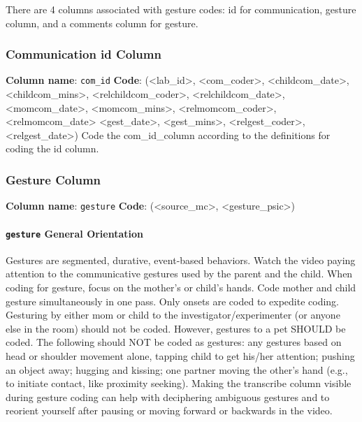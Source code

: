 \documentclass[
  12pt,
]{book}
\begin{document}
There are 4 columns associated with gesture codes: id for communication, gesture column, and a comments column for gesture.

\hypertarget{communication-id-column-1}{%
\subsubsection*{Communication id Column}\label{communication-id-column-1}}

\textbf{Column name}: \texttt{com\_id}
\textbf{Code}: (\textless lab\_id\textgreater, \textless com\_coder\textgreater, \textless childcom\_date\textgreater, \textless childcom\_mins\textgreater, \textless relchildcom\_coder\textgreater, \textless relchildcom\_date\textgreater, \textless momcom\_date\textgreater, \textless momcom\_mins\textgreater, \textless relmomcom\_coder\textgreater, \textless relmomcom\_date\textgreater{} \textless gest\_date\textgreater, \textless gest\_mins\textgreater, \textless relgest\_coder\textgreater, \textless relgest\_date\textgreater)
Code the com\_id\_column according to the definitions for coding the id column.

\hypertarget{gesture-column}{%
\subsubsection*{Gesture Column}\label{gesture-column}}

\textbf{Column name}: \texttt{gesture}
\textbf{Code}: (\textless source\_mc\textgreater, \textless gesture\_psic\textgreater)

\hypertarget{gesture-general-orientation}{%
\paragraph*{\texorpdfstring{\texttt{gesture} General Orientation}{gesture General Orientation}}\label{gesture-general-orientation}}

Gestures are segmented, durative, event-based behaviors. Watch the video paying attention to the communicative gestures used by the parent and the child. When coding for gesture, focus on the mother's or child's hands.
Code mother and child gesture simultaneously in one pass. Only onsets are coded to expedite coding.
Gesturing by either mom or child to the investigator/experimenter (or anyone else in the room) should not be coded. However, gestures to a pet SHOULD be coded. The following should NOT be coded as gestures: any gestures based on head or shoulder movement alone, tapping child to get his/her attention; pushing an object away; hugging and kissing; one partner moving the other's hand (e.g., to initiate contact, like proximity seeking).
Making the transcribe column visible during gesture coding can help with deciphering ambiguous gestures and to reorient yourself after pausing or moving forward or backwards in the video.
\end{document}
